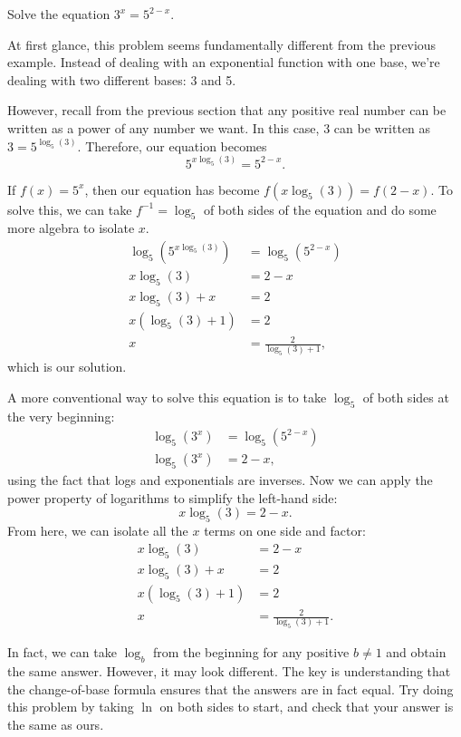 \documentclass[nooutcomes]{ximera}
\begin{document}
\begin{example}
Solve the equation $3^x = 5^{2 - x}$. 
\end{example}

\begin{explanation}
At first glance, this problem seems fundamentally different from the previous example. Instead of dealing with an exponential function with one base, we're dealing with two different bases: 3 and 5. 

However, recall from the previous section that any positive real number can be written as a power of any number we want. In this case, 3 can be written as $3 = 5^{\log_5(3)}$. Therefore, our equation becomes
$$
5^{x\log_5(3)} = 5^{2 - x}.
$$

If $f(x) = 5^x$, then our equation has become $f(x \log_5(3)) = f(2 - x)$. To solve this, we can take $f^{-1} = \log_5$ of both sides of the equation and do some more algebra to isolate $x$. 
\begin{align*}
\log_5(5^{x \log_5(3)}) & = \log_5(5^{2 -x }) \\
x\log_5(3) & = 2 - x \\
x\log_5(3) + x & = 2 \\
x(\log_5(3) + 1) & = 2 \\
x & = \frac{2}{\log_5(3) + 1},
\end{align*}
which is our solution.

A more conventional way to solve this equation is to take $\log_5$ of both sides at the very beginning:
\begin{align*}
\log_5(3^x) & = \log_5(5^{2 - x}) \\
\log_5(3^x) & = 2 - x,
\end{align*}
using the fact that logs and exponentials are inverses. Now we can apply the power property of logarithms to simplify the left-hand side:
$$
x\log_5(3) = 2 - x.
$$
From here, we can isolate all the $x$ terms on one side and factor:
\begin{align*}
x\log_5(3) & = 2 - x \\
x\log_5(3) + x & = 2 \\
x(\log_5(3) + 1) & = 2 \\
x & = \frac{2}{\log_5(3) + 1}.
\end{align*}

\end{explanation}

\begin{callout}
In fact, we can take $\log_b$ from the beginning for any positive $b \ne 1$ and obtain the same answer. However, it may look different. The key is understanding that the change-of-base formula ensures that the answers are in fact equal. Try doing this problem by taking $\ln$ on both sides to start, and check that your answer is the same as ours. 
\end{callout}
\end{document}
